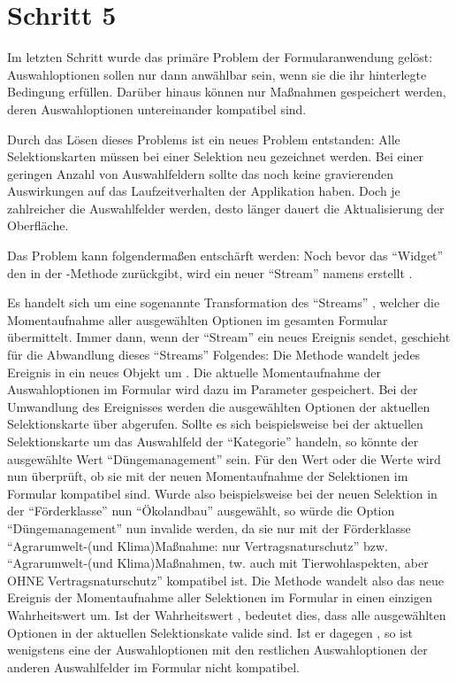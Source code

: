 \chapter{Schritt 5}
\label{chap:Schritt-5}

Im letzten Schritt wurde das primäre Problem der Formularanwendung gelöst:
Auswahloptionen sollen nur dann anwählbar sein,
wenn sie die ihr hinterlegte Bedingung erfüllen.
Darüber hinaus können nur Maßnahmen gespeichert werden,
deren Auswahloptionen untereinander kompatibel sind.

Durch das Lösen dieses Problems ist ein neues Problem entstanden:
Alle Selektionskarten müssen bei einer Selektion neu gezeichnet werden.
Bei einer geringen Anzahl von Auswahlfeldern sollte das noch keine gravierenden Auswirkungen auf das Laufzeitverhalten der Applikation haben.
Doch je zahlreicher die Auswahlfelder werden,
desto länger dauert die Aktualisierung der Oberfläche.

Das Problem kann folgendermaßen entschärft werden:
Noch bevor das \enquote{Widget}  den  in der -Methode zurückgibt,
wird ein neuer \enquote{Stream} namens  erstellt .

Es handelt sich um eine sogenannte Transformation des \enquote{Streams} , welcher die Momentaufnahme aller ausgewählten Optionen im gesamten Formular übermittelt.
Immer dann, wenn der \enquote{Stream}  ein neues Ereignis sendet,
geschieht für die Abwandlung dieses \enquote{Streams} Folgendes:
Die Methode  wandelt jedes Ereignis in ein neues Objekt um .
Die aktuelle Momentaufnahme der Auswahloptionen im Formular wird dazu im Parameter  gespeichert.
Bei der Umwandlung des Ereignisses werden die ausgewählten Optionen der aktuellen Selektionskarte über  abgerufen.
Sollte es sich beispielsweise bei der aktuellen Selektionskarte um das Auswahlfeld der \enquote{Kategorie} handeln,
so könnte der ausgewählte Wert \enquote{Düngemanagement} sein.
Für den Wert oder die Werte wird nun überprüft, ob sie mit der neuen Momentaufnahme der Selektionen im Formular kompatibel sind.
Wurde also beispielsweise bei der neuen Selektion in der \enquote{Förderklasse} nun \enquote{Ökolandbau} ausgewählt,
so würde die Option \enquote{Düngemanagement} nun invalide werden,
da sie nur mit der Förderklasse \enquote{Agrarumwelt-(und Klima)Maßnahme: nur Vertragsnaturschutz} bzw. \enquote{Agrarumwelt-(und Klima)Maßnahmen, tw. auch mit Tierwohlaspekten, aber OHNE Vertragsnaturschutz} kompatibel ist.
Die Methode  wandelt also das neue Ereignis der Momentaufnahme aller Selektionen im Formular in einen einzigen Wahrheitswert um.
Ist der Wahrheitswert ,
bedeutet dies,
dass alle ausgewählten Optionen in der aktuellen Selektionskate valide sind.
Ist er dagegen , so ist wenigstens eine der Auswahloptionen mit den restlichen Auswahloptionen der anderen Auswahlfelder im Formular nicht kompatibel.

